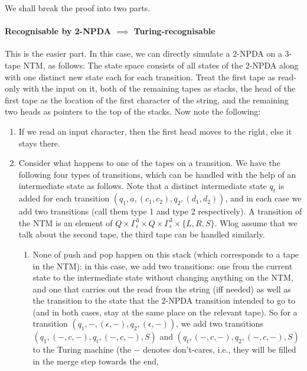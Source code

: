 \begin{soln}
    We shall break the proof into two parts.
    \paragraph{Recognisable by 2-NPDA $\implies$ Turing-recognisable} This is the easier part. In this case, we can directly simulate a 2-NPDA on a 3-tape NTM, as follows:\nl
    The state space consists of all states of the 2-NPDA along with one distinct new state each for each transition.
    Treat the first tape as read-only with the input on it, both of the remaining tapes as stacks, the head of the first tape as the location of the first character of the string, and the remaining
    two heads as pointers to the top of the stacks. Now note the following:
    \begin{enumerate}
        \item If we read an input character, then the first head moves to the right, else it stays there.
        \item Consider what happens to one of the tapes on a transition. We have the following four types of transitions, which can be handled with the help of an intermediate state as
            follows. Note that a distinct intermediate state $q_t$ is added for each transition $(q_1, a, (c_1, c_2), q_2, (d_1, d_2))$, and in each case we add two transitions (call them type 1 and
            type 2 respectively). A transition of the NTM is an element of $Q \times \Gamma_\epsilon^3 \times Q \times \Gamma_\epsilon^3 \times \{L, R, S\}$. Wlog assume that we talk
            about the second tape, the third tape can be handled similarly.
            \begin{enumerate}
                \item None of push and pop happen on this stack (which corresponds to a tape in the NTM): in this case, we add two transitions: one from the current state to the intermediate state
                    without changing anything on the NTM, and one that carries out the read from the string (iff needed) as well as the transition to the state that the 2-NPDA transition intended to go to (and
                    in both cases, stay at the same place on the relevant tape). So for a transition $(q_1, -, (\epsilon, -), q_2, (\epsilon, -))$, we add two transitions $(q_1, (-, c, -), q_t,
                    (-, c, -), S)$ and $(q_t, (-, c, -), q_2, (-, c, -), S)$ to the Turing machine (the $-$ denotes don't-cares, i.e., they will be filled in the merge step towards the end,

\end{enumerate}
\end{enumerate}
\end{soln}
